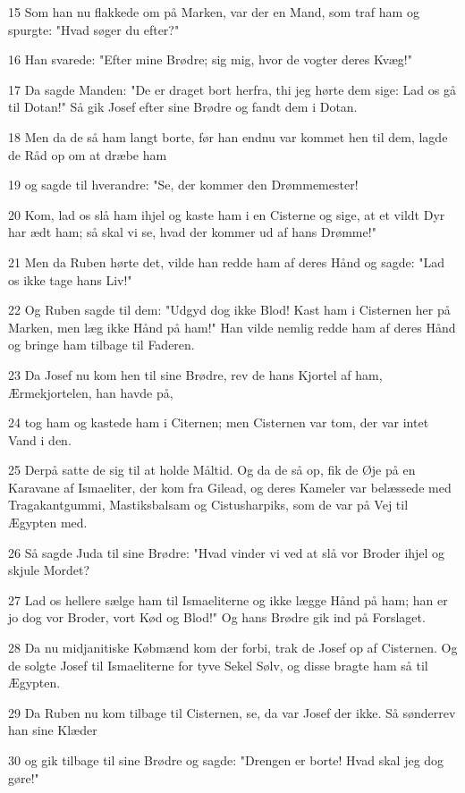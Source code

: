 \par 15 Som han nu flakkede om på Marken, var der en Mand, som traf ham og spurgte: "Hvad søger du efter?"
\par 16 Han svarede: "Efter mine Brødre; sig mig, hvor de vogter deres Kvæg!"
\par 17 Da sagde Manden: "De er draget bort herfra, thi jeg hørte dem sige: Lad os gå til Dotan!" Så gik Josef efter sine Brødre og fandt dem i Dotan.
\par 18 Men da de så ham langt borte, før han endnu var kommet hen til dem, lagde de Råd op om at dræbe ham
\par 19 og sagde til hverandre: "Se, der kommer den Drømmemester!
\par 20 Kom, lad os slå ham ihjel og kaste ham i en Cisterne og sige, at et vildt Dyr har ædt ham; så skal vi se, hvad der kommer ud af hans Drømme!"
\par 21 Men da Ruben hørte det, vilde han redde ham af deres Hånd og sagde: "Lad os ikke tage hans Liv!"
\par 22 Og Ruben sagde til dem: "Udgyd dog ikke Blod! Kast ham i Cisternen her på Marken, men læg ikke Hånd på ham!" Han vilde nemlig redde ham af deres Hånd og bringe ham tilbage til Faderen.
\par 23 Da Josef nu kom hen til sine Brødre, rev de hans Kjortel af ham, Ærmekjortelen, han havde på,
\par 24 tog ham og kastede ham i Citernen; men Cisternen var tom, der var intet Vand i den.
\par 25 Derpå satte de sig til at holde Måltid. Og da de så op, fik de Øje på en Karavane af Ismaeliter, der kom fra Gilead, og deres Kameler var belæssede med Tragakantgummi, Mastiksbalsam og Cistusharpiks, som de var på Vej til Ægypten med.
\par 26 Så sagde Juda til sine Brødre: "Hvad vinder vi ved at slå vor Broder ihjel og skjule Mordet?
\par 27 Lad os hellere sælge ham til Ismaeliterne og ikke lægge Hånd på ham; han er jo dog vor Broder, vort Kød og Blod!" Og hans Brødre gik ind på Forslaget.
\par 28 Da nu midjanitiske Købmænd kom der forbi, trak de Josef op af Cisternen. Og de solgte Josef til Ismaeliterne for tyve Sekel Sølv, og disse bragte ham så til Ægypten.
\par 29 Da Ruben nu kom tilbage til Cisternen, se, da var Josef der ikke. Så sønderrev han sine Klæder
\par 30 og gik tilbage til sine Brødre og sagde: "Drengen er borte! Hvad skal jeg dog gøre!"
